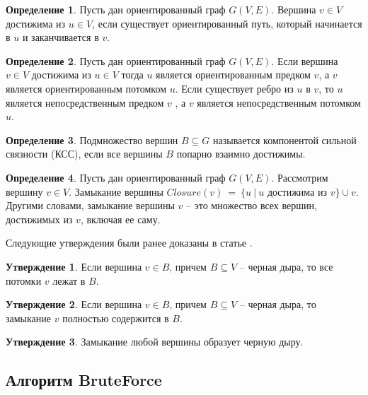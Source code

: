 \documentclass[12pt,a4paper,oneside,openany]{article}
\theoremstyle{definition}
\newtheorem{definition}{Определение}[]
\theoremstyle{lemma}
\newtheorem{lemma}{Утверждение}[]
\theoremstyle{remark}
\begin{document}
\begin{definition}\label{def:reachablevertex}
	Пусть дан ориентированный граф $G(V,E)$. Вершина $v \in V$ достижима из $u \in V$, если существует ориентированный путь, который начинается в $u$ и заканчивается в $v$.
\end{definition}

\begin{definition}\label{def:successor}
	Пусть дан ориентированный граф $G(V,E)$. Если вершина $v \in V$ достижима из $u \in V$ тогда $u$ является ориентированным предком $v$, а $v$ является ориентированным потомком $u$. Если существует ребро из $u$ в $v$, то $u$ является непосредственным предком $v$ , а $v$ является непосредственным потомком $u$.
\end{definition}

\begin{definition}\label{def:scc}
	Подмножество вершин $B \subseteq G$ называется компонентой сильной связности (КСС), если все вершины $B$ попарно взаимно достижимы.
\end{definition}

\begin{definition}\label{def:closure}
	Пусть дан ориентированный граф $G(V,E)$. Рассмотрим вершину $v \in V$. Замыкание вершины $Closure(v)\ =\ \{u\ |\ u$ достижима из $v\} \cup {v}$.
	Другими словами, замыкание вершины $v$ -- это множество всех вершин, достижимых из $v$, включая ее саму.
\end{definition}

Следующие утверждения были ранее доказаны в статье \cite{li2010detecting}.

\begin{lemma}
	Если вершина $v \in B$, причем $B \subseteq V$ -- черная дыра, то все потомки $v$ лежат в $B$.
\end{lemma}

\begin{lemma}
	Если вершина $v \in B$, причем $B \subseteq V$ -- черная дыра, то замыкание $v$ полностью содержится в $B$.
\end{lemma}

\begin{lemma}\label{lemma:closurebh}
	Замыкание любой вершины образует черную дыру.
\end{lemma}

\subsection{Алгоритм BruteForce}\label{subsec:bruteforce}
\end{document}
